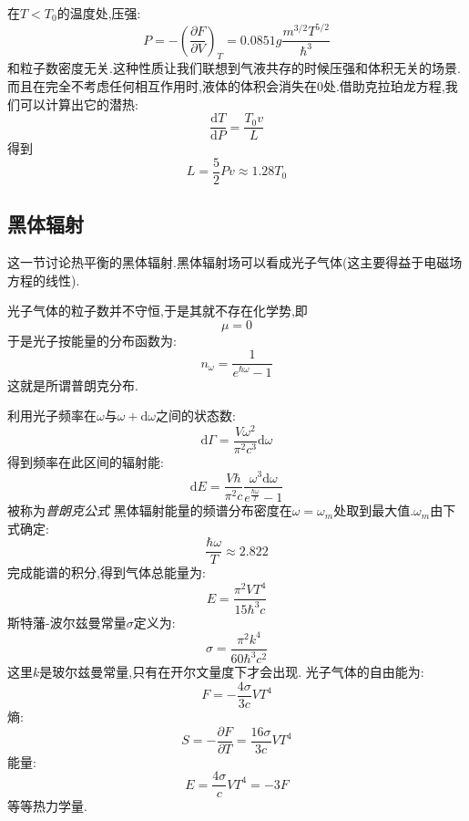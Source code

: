     在$T<T_0$的温度处,压强:
    \[P=-\left( \dfrac{\partial F}{\partial V} \right) _T=0.0851g\frac{m^{3 /2}T^{5/2}}{\hbar^{3}}\]
    和粒子数密度无关.这种性质让我们联想到气液共存的时候压强和体积无关的场景.而且在完全不考虑任何相互作用时,液体的体积会消失在0处.借助克拉珀龙方程,我们可以计算出它的潜热:
    \[\dfrac{\mathrm{d}T}{\mathrm{d} P}=\frac{T_0v}{L}\]
    得到 
    \[L=\frac{5}{2}Pv\approx 1.28T_0\]

\subsection{黑体辐射}
    这一节讨论热平衡的黑体辐射.黑体辐射场可以看成光子气体(这主要得益于电磁场方程的线性).

    光子气体的粒子数并不守恒,于是其就不存在化学势,即 
    \[\mu=0\]
    于是光子按能量的分布函数为:
    \begin{equation}
      n_\omega=\frac{1}{e^{\hbar \omega}-1}
    \end{equation}
    这就是所谓普朗克分布.

    利用光子频率在$\omega$与$\omega +\mathrm{d}  \omega$之间的状态数:
    \[\mathrm{d} \Gamma=\frac{V\omega^{2}}{\pi^{2}c^{3}}\mathrm{d} \omega\]
    得到频率在此区间的辐射能:
    \begin{equation}
      \mathrm{d} E=\frac{V\hbar}{\pi^{2}c}\frac{\omega^{3}\mathrm{d} \omega}{e^{\frac{\hbar\omega}{T}}-1}
    \end{equation}
    被称为\emph{普朗克公式}
    黑体辐射能量的频谱分布密度在$\omega=\omega_m$处取到最大值.$\omega_m$由下式确定:
    \[\frac{\hbar \omega}{T}\approx 2.822\]
    完成能谱的积分,得到气体总能量为:
    \begin{equation}
      E=\frac{\pi^{2}VT^{4}}{15\hbar^{3}c}
    \end{equation}
    斯特藩-波尔兹曼常量$\sigma$定义为:
    \[\sigma=\frac{\pi^{2}k^{4}}{60\hbar^{3}c^{2}}\]
    这里$k$是玻尔兹曼常量,只有在开尔文量度下才会出现.
    光子气体的自由能为:
    \begin{equation}
      F=-\frac{4\sigma}{3c}VT^{4}
    \end{equation}
    熵:
    \begin{equation}
      S=-\dfrac{\partial F}{\partial T}=\frac{16\sigma}{3c}VT^{4}
    \end{equation}
    能量:
    \begin{equation}
      E=\frac{4\sigma}{c}VT^{4}=-3F
    \end{equation}
    等等热力学量.
